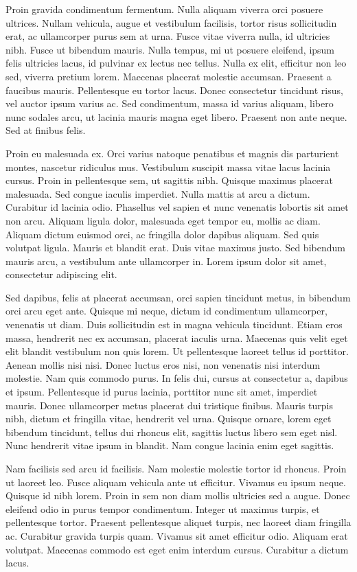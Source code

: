 Proin gravida condimentum fermentum. Nulla aliquam viverra orci posuere ultrices. Nullam vehicula, augue et vestibulum facilisis, tortor risus sollicitudin erat, ac ullamcorper purus sem at urna. Fusce vitae viverra nulla, id ultricies nibh. Fusce ut bibendum mauris. Nulla tempus, mi ut posuere eleifend, ipsum felis ultricies lacus, id pulvinar ex lectus nec tellus. Nulla ex elit, efficitur non leo sed, viverra pretium lorem. Maecenas placerat molestie accumsan. Praesent a faucibus mauris. Pellentesque eu tortor lacus. Donec consectetur tincidunt risus, vel auctor ipsum varius ac. Sed condimentum, massa id varius aliquam, libero nunc sodales arcu, ut lacinia mauris magna eget libero. Praesent non ante neque. Sed at finibus felis.

Proin eu malesuada ex. Orci varius natoque penatibus et magnis dis parturient montes, nascetur ridiculus mus. Vestibulum suscipit massa vitae lacus lacinia cursus. Proin in pellentesque sem, ut sagittis nibh. Quisque maximus placerat malesuada. Sed congue iaculis imperdiet. Nulla mattis at arcu a dictum. Curabitur id lacinia odio. Phasellus vel sapien et nunc venenatis lobortis sit amet non arcu. Aliquam ligula dolor, malesuada eget tempor eu, mollis ac diam. Aliquam dictum euismod orci, ac fringilla dolor dapibus aliquam. Sed quis volutpat ligula. Mauris et blandit erat. Duis vitae maximus justo. Sed bibendum mauris arcu, a vestibulum ante ullamcorper in. Lorem ipsum dolor sit amet, consectetur adipiscing elit.

Sed dapibus, felis at placerat accumsan, orci sapien tincidunt metus, in bibendum orci arcu eget ante. Quisque mi neque, dictum id condimentum ullamcorper, venenatis ut diam. Duis sollicitudin est in magna vehicula tincidunt. Etiam eros massa, hendrerit nec ex accumsan, placerat iaculis urna. Maecenas quis velit eget elit blandit vestibulum non quis lorem. Ut pellentesque laoreet tellus id porttitor. Aenean mollis nisi nisi. Donec luctus eros nisi, non venenatis nisi interdum molestie. Nam quis commodo purus. In felis dui, cursus at consectetur a, dapibus et ipsum. Pellentesque id purus lacinia, porttitor nunc sit amet, imperdiet mauris. Donec ullamcorper metus placerat dui tristique finibus. Mauris turpis nibh, dictum et fringilla vitae, hendrerit vel urna. Quisque ornare, lorem eget bibendum tincidunt, tellus dui rhoncus elit, sagittis luctus libero sem eget nisl. Nunc hendrerit vitae ipsum in blandit. Nam congue lacinia enim eget sagittis.

Nam facilisis sed arcu id facilisis. Nam molestie molestie tortor id rhoncus. Proin ut laoreet leo. Fusce aliquam vehicula ante ut efficitur. Vivamus eu ipsum neque. Quisque id nibh lorem. Proin in sem non diam mollis ultricies sed a augue. Donec eleifend odio in purus tempor condimentum. Integer ut maximus turpis, et pellentesque tortor. Praesent pellentesque aliquet turpis, nec laoreet diam fringilla ac. Curabitur gravida turpis quam. Vivamus sit amet efficitur odio. Aliquam erat volutpat. Maecenas commodo est eget enim interdum cursus. Curabitur a dictum lacus.

